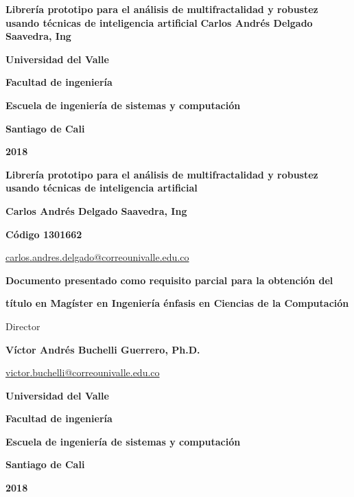 \begin{titlepage}
		\begin{center}
			{\bf Librería prototipo para el análisis de multifractalidad y robustez usando técnicas de inteligencia artificial}
			\vfill
			{\bf Carlos Andrés Delgado Saavedra, Ing}
			\vfill
			{\bf Universidad del Valle  \par}
			{\bf Facultad de ingeniería \par}
			{\bf Escuela de ingeniería de sistemas y computación \par}
			{\bf Santiago de Cali \par}
			{\bf 2018 \par}
		\end{center}
\end{titlepage}


\begin{titlepage}
	\begin{center}
		{\bf Librería prototipo para el análisis de multifractalidad y robustez usando técnicas de inteligencia artificial}
		\vfill
		{\bf Carlos Andrés Delgado Saavedra, Ing \par}
		{\bf Código 1301662 \par}
		{\url{carlos.andres.delgado@correounivalle.edu.co} \par}
		\vfill
		{\bf Documento presentado como requisito parcial para la obtención del \par}
		{\bf título en Magíster en Ingeniería énfasis en Ciencias de la Computación \par}
		\vfill

		{Director \par}
		{\bf Víctor Andrés Buchelli Guerrero, Ph.D. \par}
		{\url{victor.buchelli@correounivalle.edu.co} \par}
		\vfill
		{\bf Universidad del Valle  \par}
		{\bf Facultad de ingeniería \par}
		{\bf Escuela de ingeniería de sistemas y computación \par}
		{\bf Santiago de Cali \par}
		{\bf 2018 \par}
	\end{center}
\end{titlepage}
